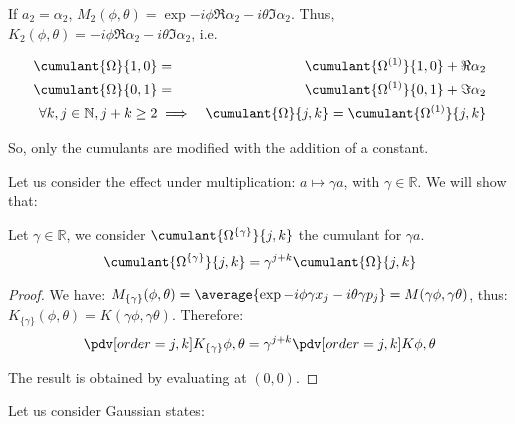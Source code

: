 \begin{corollary}
    If $a_2 = \alpha_2$, $M_2(\phi, \theta) = \exp{-i \phi \Re{\alpha_2} -i \theta \Im{\alpha_2}}$. Thus, $K_2(\phi, \theta) = -i \phi \Re{\alpha_2} -i \theta \Im{\alpha_2}$, i.e.

    \begin{eqnarray}
        \cumulant{\Omega}{{1, 0}} &=& \cumulant{\Omega^{(1)}}{{1, 0}} + \Re{\alpha_2}\\
        \cumulant{\Omega}{{0,1}} &=& \cumulant{\Omega^{(1)}}{{0, 1}} + \Im{\alpha_2}\\
        \forall k, j \in \mathbb{N}, j + k \ge 2 &\implies& \cumulant{\Omega}{{j,k}} = \cumulant{\Omega^{(1)}}{{j, k}}
    \end{eqnarray}

    So, only the cumulants are modified with the addition of a constant.
\end{corollary}

Let us consider the effect under multiplication: $a \mapsto \gamma a$, with $\gamma \in \mathbb{R}$. We will show that:

\begin{theorem}
    Let $\gamma \in \mathbb{R}$, we consider $\cumulant{\Omega^{\{\gamma\}}}{{j, k}}$ the cumulant for $\gamma a$.
    \begin{equation}
        \cumulant{\Omega^{\{\gamma\}}}{{j, k}} = \gamma^{j+k} \cumulant{\Omega}{{j, k}}
    \end{equation}
\end{theorem}

\begin{proof}
    We have: $M_{\{\gamma\}}(\phi, \theta) = \average{\exp{-i \phi \gamma x_j -i \theta \gamma p_j}} = M(\gamma \phi, \gamma \theta)$, thus: $K_{\{\gamma\}}(\phi, \theta) = K(\gamma \phi, \gamma \theta)$. Therefore:
    \begin{equation}
        \pdv[order={j, k}]{K_{\{\gamma\}}}{\phi, \theta} = \gamma^{j+k} \pdv[order={j, k}]{K}{\phi, \theta}
    \end{equation}

    The result is obtained by evaluating at $(0, 0)$.
\end{proof}

Let us consider Gaussian states:

